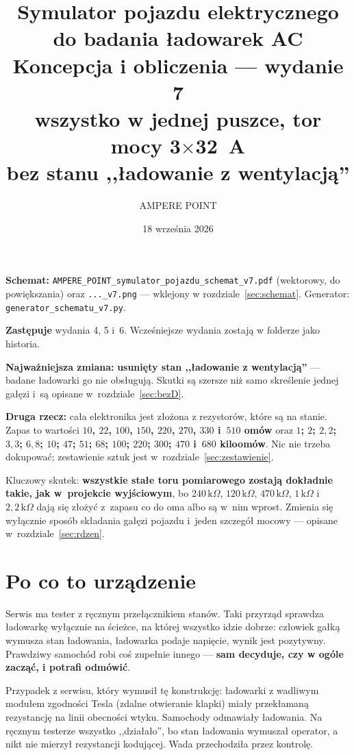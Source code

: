 \documentclass[a4paper,11pt]{article}
\title{\vspace{-1.5cm}Symulator pojazdu elektrycznego do badania ładowarek AC\\[2mm]
\large Koncepcja i obliczenia --- wydanie 7\\[1mm]
\normalsize wszystko w jednej puszce, tor mocy 3$\times$32~A\\[1mm]
\normalsize bez stanu ,,ładowanie z wentylacją''}
\author{AMPERE POINT}
\date{18 września 2026}
\newcommand{\kohm}{\,\mathrm{k}\Omega}
\begin{document}
\maketitle
\thispagestyle{empty}

\noindent\textbf{Schemat:} \texttt{AMPERE\_POINT\_symulator\_pojazdu\_schemat\_v7.pdf}
(wektorowy, do powiększania) oraz \texttt{...\_v7.png} --- wklejony w rozdziale~\ref{sec:schemat}.
Generator: \texttt{generator\_schematu\_v7.py}.

\noindent\textbf{Zastępuje} wydania 4, 5 i~6. Wcześniejsze wydania zostają w folderze jako
historia.

\noindent\textbf{Najważniejsza zmiana:} \textbf{usunięty stan ,,ładowanie z wentylacją''}
--- badane ładowarki go nie obsługują. Skutki są szersze niż samo skreślenie jednej gałęzi
i~są opisane w~rozdziale~\ref{sec:bezD}.

\noindent\textbf{Druga rzecz:} cała elektronika jest złożona z rezystorów, które
są na stanie. Zapas to wartości \textbf{$10$, $22$, $100$, $150$, $220$, $270$, $330$
i~$510$ omów} oraz \textbf{$1$; $2$; $2{,}2$; $3{,}3$; $6{,}8$; $10$; $47$; $51$; $68$;
$100$; $220$; $300$; $470$ i~$680$ kiloomów}. Nic nie trzeba dokupować; zestawienie sztuk
jest w~rozdziale~\ref{sec:zestawienie}.

\noindent Kluczowy skutek: \textbf{wszystkie stałe toru pomiarowego zostają dokładnie takie,
jak w~projekcie wyjściowym}, bo $240\kohm$, $120\kohm$, $470\kohm$, $1\kohm$ i~$2{,}2\kohm$
dają się złożyć z~zapasu co do oma albo są w~nim wprost. Zmienia się wyłącznie sposób
składania gałęzi pojazdu i~jeden szczegół mocowy --- opisane w~rozdziale~\ref{sec:rdzen}.

\tableofcontents

\section{Po co to urządzenie}

Serwis ma tester z ręcznym przełącznikiem stanów. Taki przyrząd sprawdza ładowarkę
wyłącznie na ścieżce, na której wszystko idzie dobrze: człowiek gałką wymusza stan
ładowania, ładowarka podaje napięcie, wynik jest pozytywny. Prawdziwy samochód robi
coś zupełnie innego --- \textbf{sam decyduje, czy w ogóle zacząć, i potrafi odmówić}.

Przypadek z serwisu, który wymusił tę konstrukcję: ładowarki z wadliwym modułem
zgodności Tesla (zdalne otwieranie klapki) miały przekłamaną rezystancję na linii
obecności wtyku. Samochody odmawiały ładowania. Na ręcznym testerze wszystko
,,działało'', bo stan ładowania wymuszał operator, a nikt nie mierzył rezystancji
kodującej. Wada przechodziła przez kontrolę.
\end{document}
